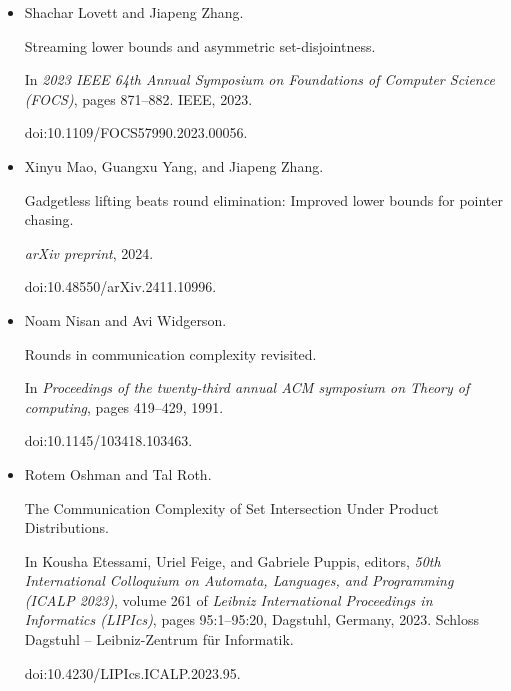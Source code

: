 \documentclass[10pt,a4paper]{article}
\begin{document}
\begin{itemize}
doi:10.4230/LIPICS.CCC.2019.5.





\item[] 
[37]

Shachar Lovett and Jiapeng Zhang.


Streaming lower bounds and asymmetric set-disjointness.


In \emph{2023 IEEE 64th Annual Symposium on Foundations of Computer
Science (FOCS)}, pages 871–882. IEEE, 2023.


doi:10.1109/FOCS57990.2023.00056.





\item[] 
[38]

Xinyu Mao, Guangxu Yang, and Jiapeng Zhang.


Gadgetless lifting beats round elimination: Improved lower bounds for
pointer chasing.


\emph{arXiv preprint}, 2024.


doi:10.48550/arXiv.2411.10996.





\item[] 
[39]

Noam Nisan and Avi Widgerson.


Rounds in communication complexity revisited.


In \emph{Proceedings of the twenty-third annual ACM symposium on
Theory of computing}, pages 419–429, 1991.


doi:10.1145/103418.103463.





\item[] 
[40]

Rotem Oshman and Tal Roth.


The Communication Complexity of Set Intersection Under Product
Distributions.


In Kousha Etessami, Uriel Feige, and Gabriele Puppis, editors, \emph{50th International Colloquium on Automata, Languages, and Programming (ICALP
2023)}, volume 261 of \emph{Leibniz International Proceedings in Informatics
(LIPIcs)}, pages 95:1–95:20, Dagstuhl, Germany, 2023. Schloss Dagstuhl –
Leibniz-Zentrum für Informatik.


doi:10.4230/LIPIcs.ICALP.2023.95.






\end{itemize}
\end{document}
